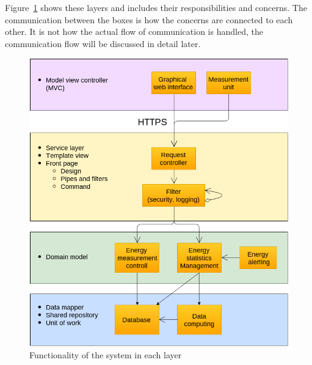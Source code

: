 


Figure~\ref{fig:layersflow} shows these layers and includes their responsibilities and concerns. The communication between the boxes is how the concerns are connected to each other. It is not how the actual flow of communication is handled, the communication flow will be discussed in detail later.

\begin{figure}[H]
\centering
\includegraphics[scale=0.45]{7-software/images/layersflow.png}
\caption{Functionality of the system in each layer}
\label{fig:layersflow}
\end{figure}

